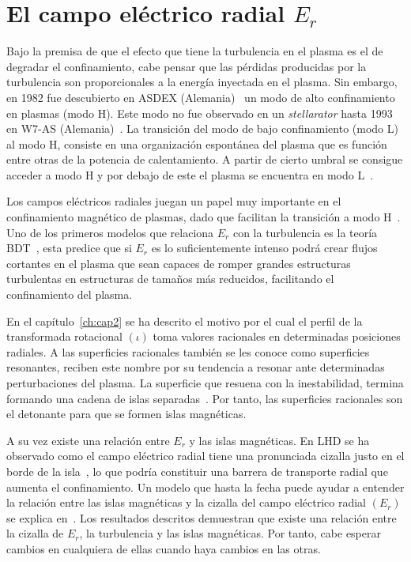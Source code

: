 \section{El campo eléctrico radial \texorpdfstring{$E_r$}{Er}}
Bajo la premisa de que el efecto que tiene la turbulencia en el plasma es el de degradar
el confinamiento, cabe pensar que las pérdidas producidas por la turbulencia son proporcionales
a la energía inyectada en el plasma. Sin embargo, en 1982 fue descubierto en ASDEX
(Alemania)~\cite{PhysRevLett.49.1408} un modo de alto confinamiento en plasmas (modo H). Este modo no fue
observado en un \textit{stellarator} hasta 1993 en W7-AS (Alemania)~\cite{PhysRevLett.70.2086}.
La transición del modo de bajo confinamiento (modo L) al modo H, consiste en una organización 
espontánea del plasma que es función entre otras de la potencia de calentamiento.
A partir de cierto umbral se consigue acceder a modo H y por debajo de este el plasma se
encuentra en modo L~\cite{Ryter_1998}.\par
Los campos eléctricos radiales juegan un papel muy importante en el confinamiento magnético
de plasmas, dado que facilitan la transición a modo H~\cite{PhysRevLett.107.245004,Itoh_1989}. 
Uno de los primeros modelos
que relaciona $E_r$ con la turbulencia es la teoría BDT~\cite{doi:10.1063/1.859529}, 
esta predice que si $E_r$ es lo
suficientemente intenso podrá crear flujos cortantes en el plasma que sean capaces de romper
grandes estructuras turbulentas en estructuras de tamaños más reducidos, 
facilitando el confinamiento del plasma.\par
En el capítulo~\ref{ch:cap2} se ha descrito el motivo por el cual el perfil de la transformada rotacional
$(\iota)$ toma valores racionales en determinadas posiciones radiales. A las superficies racionales
también se les conoce como superficies resonantes, reciben este nombre por su
tendencia a resonar ante determinadas perturbaciones del plasma. La superficie que resuena
con la inestabilidad, termina formando una cadena de islas separadas~\cite{doi:10.1063/1.1706761}. 
Por tanto, las superficies racionales son el detonante para que se formen islas magnéticas.\par
A su vez existe una relación entre $E_r$ y las islas magnéticas. En LHD se ha observado como
el campo eléctrico radial tiene una pronunciada cizalla justo en el borde de la isla~\cite{Ida_2004}, lo que
podría constituir una barrera de transporte radial que aumenta el confinamiento. 
Un modelo que hasta la fecha puede ayudar a entender la relación
entre las islas magnéticas y la cizalla del campo eléctrico radial $(E_r)$ se explica en~\cite{doi:10.1063/1.1491533}.
Los resultados descritos demuestran que existe una relación entre la cizalla de $E_r$, la turbulencia
y las islas magnéticas. Por tanto, cabe esperar cambios en cualquiera de ellas cuando haya cambios en las otras.
